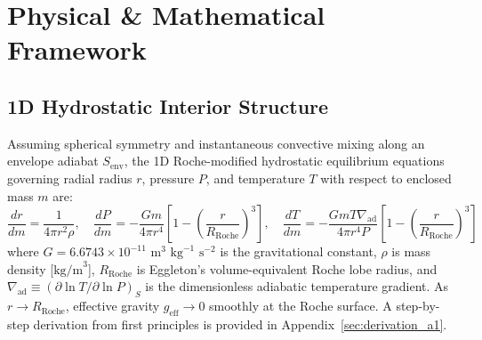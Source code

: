 \section{Physical \& Mathematical Framework}

\subsection{1D Hydrostatic Interior Structure}
Assuming spherical symmetry and instantaneous convective mixing along an envelope adiabat $S_{\mathrm{env}}$, the 1D Roche-modified hydrostatic equilibrium equations governing radial radius $r$, pressure $P$, and temperature $T$ with respect to enclosed mass $m$ are:
\begin{equation}
\frac{dr}{dm} = \frac{1}{4\pi r^2 \rho}, \quad \frac{dP}{dm} = -\frac{G m}{4\pi r^4} \left[ 1 - \left(\frac{r}{R_{\text{Roche}}}\right)^3 \right], \quad \frac{dT}{dm} = -\frac{G m T \nabla_{\mathrm{ad}}}{4\pi r^4 P} \left[ 1 - \left(\frac{r}{R_{\text{Roche}}}\right)^3 \right]
\end{equation}
where $G = 6.6743 \times 10^{-11}\text{ m}^3\text{ kg}^{-1}\text{ s}^{-2}$ is the gravitational constant, $\rho$ is mass density [$\text{kg/m}^3$], $R_{\text{Roche}}$ is Eggleton's volume-equivalent Roche lobe radius, and $\nabla_{\mathrm{ad}} \equiv (\partial \ln T / \partial \ln P)_S$ is the dimensionless adiabatic temperature gradient. As $r \to R_{\text{Roche}}$, effective gravity $g_{\text{eff}} \to 0$ smoothly at the Roche surface. A step-by-step derivation from first principles is provided in Appendix~\ref{sec:derivation_a1}.

